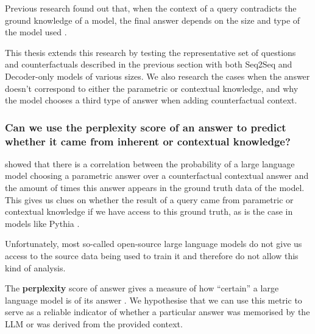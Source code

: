 Previous research found out that, when the context of a query contradicts the ground knowledge of a model, the final answer depends on the size and type of the model used \citep{factual_recall}.

This thesis extends this research by testing the representative set of questions and counterfactuals described in the previous section with both Seq2Seq and Decoder-only models of various sizes.
We also research the cases when the answer doesn't correspond to either the parametric or contextual knowledge, and why the model chooses a third type of answer when adding counterfactual context.


\subsubsection{Can we use the perplexity score of an answer to predict whether it came from inherent or contextual knowledge?}

 showed that there is a correlation between the probability of a large language model choosing a parametric answer over a counterfactual contextual answer and the amount of times this answer appears in the ground truth data of the model.
This gives us clues on whether the result of a query came from parametric or contextual knowledge if we have access to this ground truth, as is the case in models like Pythia \citep{pythia}.

Unfortunately, most so-called open-source large language models do not give us access to the source data being used to train it and therefore do not allow this kind of analysis.

The \textbf{perplexity} score of answer gives a measure of how ``certain'' a large language model is of its answer \citep{how_can_we_know}.
We hypothesise that we can use this metric to serve as a reliable indicator of whether a particular answer was memorised by the LLM or was derived from the provided context.
